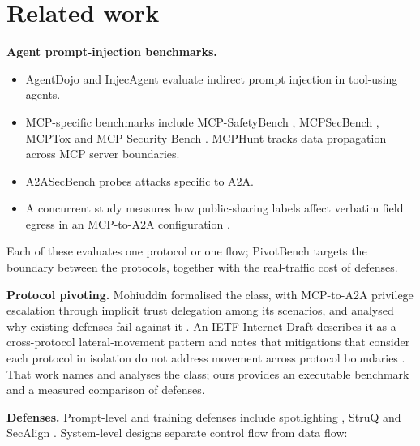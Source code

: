 \documentclass[
  11pt]{article}
\providecommand{\tightlist}{%
  \setlength{\itemsep}{0pt}\setlength{\parskip}{0pt}}
\begin{document}
\hypertarget{sec:related}{%
\section{Related work}\label{sec:related}}

\textbf{Agent prompt-injection benchmarks.}

\begin{itemize}
\tightlist
\item
  AgentDojo \citep{agentdojo} and InjecAgent \citep{injecagent} evaluate
  indirect prompt injection in tool-using agents.
\item
  MCP-specific benchmarks include MCP-SafetyBench
  \citep{mcpsafetybench}, MCPSecBench \citep{mcpsecbench}, MCPTox
  \citep{mcptox} and MCP Security Bench \citep{mcpsecuritybench}.
  MCPHunt \citep{mcphunt} tracks data propagation across MCP server
  boundaries.
\item
  A2ASecBench \citep{a2asecbench} probes attacks specific to A2A.
\item
  A concurrent study measures how public-sharing labels affect verbatim
  field egress in an MCP-to-A2A configuration \citep{egress2026}.
\end{itemize}

Each of these evaluates one protocol or one flow; PivotBench targets the
boundary between the protocols, together with the real-traffic cost of
defenses.

\textbf{Protocol pivoting.} Mohiuddin formalised the class, with
MCP-to-A2A privilege escalation through implicit trust delegation among
its scenarios, and analysed why existing defenses fail against it
\citep{mohiuddin2026}. An IETF Internet-Draft describes it as a
cross-protocol lateral-movement pattern and notes that mitigations that
consider each protocol in isolation do not address movement across
protocol boundaries \citep{mohiuddindraft}. That work names and analyses
the class; ours provides an executable benchmark and a measured
comparison of defenses.

\textbf{Defenses.} Prompt-level and training defenses include
spotlighting \citep{spotlighting}, StruQ \citep{struq} and SecAlign
\citep{secalign}. System-level designs separate control flow from data
flow:
\end{document}
